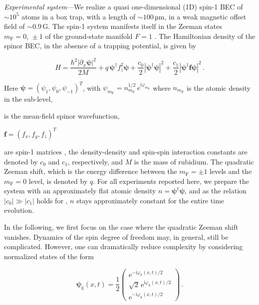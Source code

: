 \documentclass[aps,

               pra,
               twocolumn,
               amsmath,
               amssymb,
               superscriptaddress,
               reprint,
               10pt
              ]{revtex4-2}
\newcommand{\phis}{\varphi_\mathrm{S}}
\newcommand{\mf}{m_\mathrm{F}}
\newcommand{\e}{\mathrm{e}}
\begin{document}
\textit{Experimental system}---We realize a quasi one-dim\-ensional (1D) spin-1 BEC of $\sim 10^5$  atoms in a box trap, with a length of $\sim100 \,\text{µm}$, in a weak magnetic offset field  of $\sim 0.9 \, \mathrm{G}$.
The spin-1 system manifests itself in the Zeeman states $\mf= 0, \, \pm 1$ of the ground-state manifold $F=1$ .
The Hamiltonian density of the spinor BEC, in the absence of a trapping potential, is given by \cite{Stamper-Kurn2013}

\begin{equation}\label{eq:hamiltonian}
    H = \frac{\hbar^2 |\partial_x \boldsymbol{\psi}|^2}{2 M} + q\, \boldsymbol{\psi}^{\dagger} f_z^2 \boldsymbol{\psi} + \frac{c_0}{2} |\boldsymbol{\psi}^{\dagger} \boldsymbol{\psi}|^2 + \frac{c_1}{2} |\boldsymbol{\psi}^{\dagger} \boldsymbol{f} \boldsymbol{\psi}|^2\,.
\end{equation}

Here $\boldsymbol{\psi} = (\psi_1, \psi_0, \psi_{-1})^T$, with $\psi_{\mf} = {n_{\mf}^{1/2}} \, e^{\mathrm{i} \varphi_{\mf}}$ where $n_{\mf}$ is the atomic density in the sub-level,

is the mean-field spinor wavefunction,

$\boldsymbol{f} = (f_x, f_y, f_z)^T$

are spin-1 matrices \cite{Kawaguchi2012}, the density-density and spin-spin interaction constants are denoted by $c_0$ and $c_1$, respectively, and $M$ is the mass of rubidium. The quadratic Zeeman shift, which is the energy difference between the $\mf=\pm 1$ levels and the $\mf=0$ level, is denoted by $q$. For all experiments reported here, we prepare the system with an approximately flat atomic density $n=\boldsymbol{\psi}^{\dagger}\boldsymbol{\psi}$, and as the relation $|c_0| \gg |c_1|$ holds for , $n$ stays approximately constant for the entire time evolution.

In the following, we first focus on the case where the quadratic Zeeman shift vanishes.
Dynamics of the spin degree of freedom may, in general, still be complicated.
However, one can dramatically reduce complexity by considering normalized states of the form

\begin{equation}
\boldsymbol{\psi}_{\mathrm{g}} (x,t)
=  \frac{1}{2}
\begin{pmatrix}
\e^{- \mathrm{i} \phis(x,t)/2}\\
{\sqrt{2}}\, \e^{\mathrm{i} \phis(x,t)/2}\\
\e^{- \mathrm{i} \phis(x,t)/2} \end{pmatrix} \,.
\end{equation}
\end{document}
